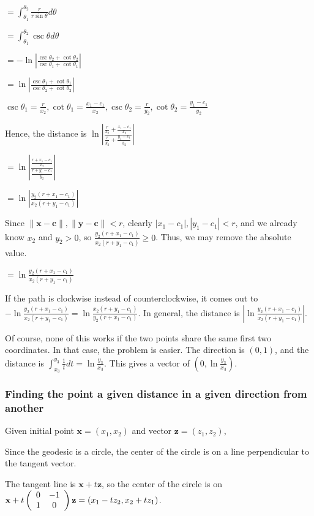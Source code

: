 $= \int_{\theta_1}^{\theta_2} \frac{r}{r\sin\theta} d\theta$

$= \int_{\theta_1}^{\theta_2} \csc\theta d\theta$

$= -\ln\left|\frac{\csc\theta_2+\cot\theta_2}{\csc\theta_1+\cot\theta_1}\right|$

$= \ln\left|\frac{\csc\theta_1+\cot\theta_1}{\csc\theta_2+\cot\theta_2}\right|$

$\csc\theta_1 = \frac{r}{x_2}, \cot\theta_1 = \frac{x_1-c_1}{x_2}, \csc\theta_2 = \frac{r}{y_2}, \cot\theta_2 = \frac{y_1-c_1}{y_2}$

Hence, the distance is $\ln\left|\frac{\frac{r}{x_2}+\frac{x_1-c_1}{x_2}}{\frac{r}{y_2}+\frac{y_1-c_1}{y_2}}\right|$

$= \ln\left|\frac{\frac{r+x_1-c_1}{x_2}}{\frac{r+y_1-c_1}{y_2}}\right|$

$= \ln\left|\frac{y_2(r+x_1-c_1)}{x_2(r+y_1-c_1)}\right|$

Since $\|\textbf{x}-\textbf{c}\|, \|\textbf{y}-\textbf{c}\| < r$, clearly $|x_1-c_1|, |y_1-c_1| < r$, and we already know $x_2$ and $y_2 > 0$, so $\frac{y_2(r+x_1-c_1)}{x_2(r+y_1-c_1)} \geq 0$. Thus, we may remove the absolute value.


$= \ln\frac{y_2(r+x_1-c_1)}{x_2(r+y_1-c_1)}$

If the path is clockwise instead of counterclockwise, it comes out to $-\ln\frac{y_2(r+x_1-c_1)}{x_2(r+y_1-c_1)} = \ln\frac{x_2(r+y_1-c_1)}{y_2(r+x_1-c_1)}$. In general, the distance is $\left|\ln\frac{y_2(r+x_1-c_1)}{x_2(r+y_1-c_1)}\right|$.

Of course, none of this works if the two points share the same first two coordinates. In that case, the problem is easier. The direction is $(0,1)$, and the distance is $\int_{x_3}^{y_3} \frac{1}{t} dt = \ln\frac{y_3}{x_3}$. This gives a vector of $(0,\ln\frac{y_3}{x_3})$.

\subsubsection{Finding the point a given distance in a given direction from another}

Given initial point $\textbf{x} = (x_1,x_2)$ and vector $\textbf{z} = (z_1,z_2)$,

Since the geodesic is a circle, the center of the circle is on a line perpendicular to the tangent vector.

The tangent line is $\textbf{x}+t\textbf{z}$, so the center of the circle is on $\textbf{x}+t\left(\begin{array}{ccc} 0 & -1 \\1 & 0 \end{array} \right)\textbf{z} = (x_1-tz_2,x_2+tz_1)$.

